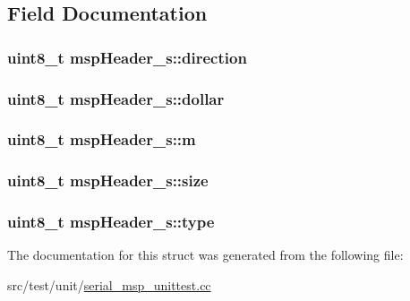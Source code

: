 \subsection{Field Documentation}
\hypertarget{structmspHeader__s_aa19d751542aded63cc57d54fbe58b0cf}{
\subsubsection[{direction}]{\setlength{\rightskip}{0pt plus 5cm}uint8\+\_\+t msp\+Header\+\_\+s\+::direction}}\label{structmspHeader__s_aa19d751542aded63cc57d54fbe58b0cf}
\hypertarget{structmspHeader__s_a97acab9a44765c5c59073e4411ba34e8}{
\subsubsection[{dollar}]{\setlength{\rightskip}{0pt plus 5cm}uint8\+\_\+t msp\+Header\+\_\+s\+::dollar}}\label{structmspHeader__s_a97acab9a44765c5c59073e4411ba34e8}
\hypertarget{structmspHeader__s_a8915b16f59d6f845def50ef343cd68e1}{
\subsubsection[{m}]{\setlength{\rightskip}{0pt plus 5cm}uint8\+\_\+t msp\+Header\+\_\+s\+::m}}\label{structmspHeader__s_a8915b16f59d6f845def50ef343cd68e1}
\hypertarget{structmspHeader__s_a087b28e55d51c726ecb21f372adb7311}{
\subsubsection[{size}]{\setlength{\rightskip}{0pt plus 5cm}uint8\+\_\+t msp\+Header\+\_\+s\+::size}}\label{structmspHeader__s_a087b28e55d51c726ecb21f372adb7311}
\hypertarget{structmspHeader__s_a46e4a915f89187c3304b9d50dfd094c0}{
\subsubsection[{type}]{\setlength{\rightskip}{0pt plus 5cm}uint8\+\_\+t msp\+Header\+\_\+s\+::type}}\label{structmspHeader__s_a46e4a915f89187c3304b9d50dfd094c0}


The documentation for this struct was generated from the following file\+:\begin{DoxyCompactItemize}
\item 
src/test/unit/\hyperlink{serial__msp__unittest_8cc}{serial\+\_\+msp\+\_\+unittest.\+cc}\end{DoxyCompactItemize}

